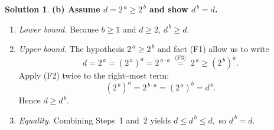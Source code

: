 \documentclass[12pt]{article}
\theoremstyle{definition} %
\newtheorem{solution}{Solution}
\theoremstyle{plain} %
\begin{document}
\begin{solution}
    \bigskip
    \noindent\textbf{(b)  Assume $d=2^{\,a}\ge 2^{\,b}$ and show $d^{\,b}=d$.}
    
    \begin{enumerate}
      \item[] \emph{Lower bound.}
            Because $b\ge 1$ and $d\ge 2$,
            \(
              d^{\,b}\ge d.
            \)
    
      \item[] \emph{Upper bound.}
            The hypothesis $2^{\,a}\ge 2^{\,b}$ and fact (F1) allow us to write
            \[
               d
               = 2^{\,a}
               = (2^{\,a})^{a}
               = 2^{\,a\cdot a}
               \;\overset{\text{(F3)}}{=}\;
                 2^{\,a}
               \ge (2^{\,b})^{a}.
            \]
            Apply (F2) twice to the right--most term:
            \[
               (2^{\,b})^{a}
               =2^{\,b\cdot a}
               =(2^{\,a})^{b}
               =d^{\,b}.
            \]
            Hence $d\ge d^{\,b}$.
    
      \item[] \emph{Equality.}
            Combining Steps~1 and~2 yields
            \(
              d\le d^{\,b}\le d,
            \)
            so $d^{\,b}=d$.
    \end{enumerate}
    \end{solution}
\end{document}
